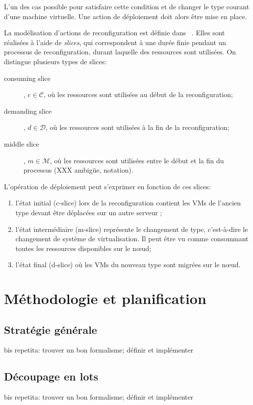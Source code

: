 \documentclass[a4paper]{article}
\begin{document}
L'un des cas possible pour satisfaire cette condition et de changer le
type courant d'une machine virtuelle. Une action de déploiement doit
alors être mise en place.

La modélisation d'actions de reconfiguration est définie dans ~\cite{herm2012}.
Elles sont réalisées à l'aide de \textit{slices}, qui correspondent à
une durée finie pendant un processus de reconfiguration, durant laquelle
des ressources sont utilisées.
On distingue plusieurs types de slices:
\begin{description}
	\item[consuming slice], $c \in \mathcal C$, où les ressources sont
		utilisées au début de la reconfiguration;
	\item[demanding slice], $d \in \mathcal D$, où les ressources sont
		utilisées à la fin de la reconfiguration;
	\item[middle slice], $m \in \mathcal M$, où les ressources sont utilisées
		entre le début et la fin du processus (XXX ambigüe, notation).
\end{description}

L'opération de déploiement peut s'exprimer en fonction de ces slices:
\begin{enumerate}
	\item l'état initial (c-slice) lors de la reconfiguration contient les
		VMs de l'ancien type devant être déplacées sur un autre serveur ;
	\item l'état intermédiaire (m-slice) représente le changement de type,
		c'est-à-dire le changement de système de virtualisation. Il
		peut être vu comme consommant toutes les ressources disponibles
		sur le nœud;
	\item l'état final (d-slice) où les VMs du nouveau type sont migrées sur
		le nœud.
\end{enumerate}

\section{Méthodologie et planification}
\subsection{Stratégie générale}
bis repetita: trouver un bon formalisme; définir et implémenter
\subsection{Découpage en lots}
bis repetita: trouver un bon formalisme; définir et implémenter
\end{document}
